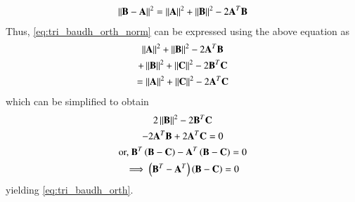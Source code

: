 \begin{enumerate}[label=\arabic*.,ref=\thesubsection.\theenumi]
\begin{align}
\left\lVert\mathbf{B}-\mathbf{A}\right\rVert^2 = 
\left\lVert\mathbf{A}\right\rVert^2 + \left\lVert\mathbf{B}\right\rVert^2 - 2\mathbf{A}^T\mathbf{B}
\end{align}
%
Thus, \eqref{eq:tri_baudh_orth_norm} can be expressed using the above equation as
\begin{multline}
\left\lVert\mathbf{A}\right\rVert^2 + \left\lVert\mathbf{B}\right\rVert^2 - 2\mathbf{A}^T\mathbf{B}
\\
+
\left\lVert\mathbf{B}\right\rVert^2 + \left\lVert\mathbf{C}\right\rVert^2 - 2\mathbf{B}^T\mathbf{C}
\\
=
\left\lVert\mathbf{A}\right\rVert^2 + \left\lVert\mathbf{C}\right\rVert^2 - 2\mathbf{A}^T\mathbf{C}
\end{multline}
%
which can be simplified to obtain
%
\begin{multline}
2\left\lVert\mathbf{B}\right\rVert^2 - 2\mathbf{B}^T\mathbf{C}
\\
- 2\mathbf{A}^T\mathbf{B}+ 2\mathbf{A}^T\mathbf{C}
=0
\\
\text{or, } \mathbf{B}^T\left(\mathbf{B}-\mathbf{C}\right)
-\mathbf{A}^T\left(\mathbf{B}-\mathbf{C}\right) = 0
\\
\implies \left(\mathbf{B}^T-\mathbf{A}^T\right)\left(\mathbf{B}-\mathbf{C}\right) = 0
\end{multline}
yielding \eqref{eq:tri_baudh_orth}.

\end{enumerate}
